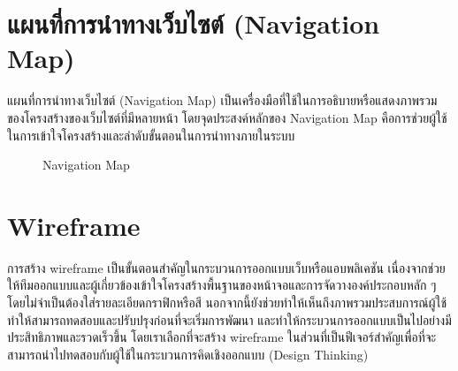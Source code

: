 
\section{แผนที่การนำทางเว็บไซต์ (Navigation Map)}
แผนที่การนำทางเว็บไซต์ (Navigation Map) เป็นเครื่องมือที่ใช้ในการอธิบายหรือแสดงภาพรวมของโครงสร้างของเว็บไซต์ที่มีหลายหน้า โดยจุดประสงค์หลักของ Navigation Map คือการช่วยผู้ใช้ในการเข้าใจโครงสร้างและลำดับขั้นตอนในการนำทางภายในระบบ
\begin{figure}[H]\centering
    \setlength{\fboxrule}{0.2mm} %
    \setlength{\fboxsep}{0.5cm}
    \caption{Navigation Map}\label{fig:navMap}
\end{figure}
\newpage


\section{Wireframe}
การสร้าง wireframe เป็นขั้นตอนสำคัญในกระบวนการออกแบบเว็บหรือแอบพลิเคชัน เนื่องจากช่วยให้ทีมออกแบบและผู้เกี่ยวข้องเข้าใจโครงสร้างพื้นฐานของหน้าจอและการจัดวางองค์ประกอบหลัก ๆ โดยไม่จำเป็นต้องใส่รายละเอียดกราฟิกหรือสี นอกจากนี้ยังช่วยทำให้เห็นถึงภาพรวมประสบการณ์ผู้ใช้
ทำให้สามารถทดสอบและปรับปรุงก่อนที่จะเริ่มการพัฒนา และทำให้กระบวนการออกแบบเป็นไปอย่างมีประสิทธิภาพและรวดเร็วขึ้น โดยเราเลือกที่จะสร้าง wireframe ในส่วนที่เป็นฟีเจอร์สำคัญเพื่อที่จะสามารถนำไปทดสอบกับผู้ใช้ในกระบวนการคิดเชิงออกแบบ (Design Thinking)
